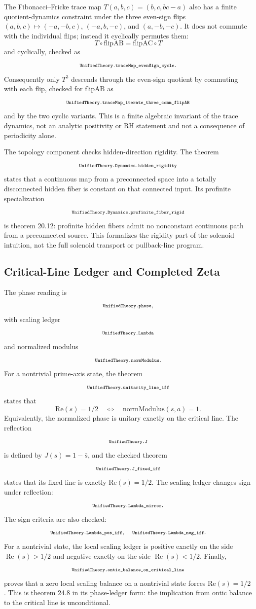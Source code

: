 \documentclass[11pt]{article}
\newcommand{\lean}[1]{\relax\ifmmode\hbox{\scriptsize\ttfamily\detokenize{#1}}\else{\small\texttt{\detokenize{#1}}}\fi}
\begin{document}
The Fibonacci--Fricke trace map $T(a,b,c)=(b,c,bc-a)$ also has a finite quotient-dynamics constraint under the three even-sign flips $(a,b,c)\mapsto(-a,-b,c)$, $(-a,b,-c)$, and $(a,-b,-c)$.  It does not commute with the individual flips; instead it cyclically permutes them:
$$
  T\circ\mathrm{flipAB}=\mathrm{flipAC}\circ T
$$
and cyclically, checked as
$$
  \lean{UnifiedTheory.traceMap_evenSign_cycle}.
$$
Consequently only $T^3$ descends through the even-sign quotient by commuting with each flip, checked for $\mathrm{flipAB}$ as
$$
  \lean{UnifiedTheory.traceMap_iterate_three_comm_flipAB}
$$
and by the two cyclic variants.  This is a finite algebraic invariant of the trace dynamics, not an analytic positivity or RH statement and not a consequence of periodicity alone.

The topology component checks hidden-direction rigidity.  The theorem
$$
  \lean{UnifiedTheory.Dynamics.hidden_rigidity}
$$
states that a continuous map from a preconnected space into a totally disconnected hidden fiber is constant on that connected input.  Its profinite specialization
$$
  \lean{UnifiedTheory.Dynamics.profinite_fiber_rigid}
$$
is theorem 20.12: profinite hidden fibers admit no nonconstant continuous path from a preconnected source.  This formalizes the rigidity part of the solenoid intuition, not the full solenoid transport or pullback-line program.

\subsection{Critical-Line Ledger and Completed Zeta}

The phase reading is
$$
  \lean{UnifiedTheory.phase},
$$
with scaling ledger
$$
  \lean{UnifiedTheory.Lambda}
$$
and normalized modulus
$$
  \lean{UnifiedTheory.normModulus}.
$$
For a nontrivial prime-axis state, the theorem
$$
  \lean{UnifiedTheory.unitarity_line_iff}
$$
states that
$$
  \mathrm{Re}(s)=1/2
  \quad\Longleftrightarrow\quad
  \mathrm{normModulus}(s,a)=1.
$$
Equivalently, the normalized phase is unitary exactly on the critical line.  The reflection
$$
  \lean{UnifiedTheory.J}
$$
is defined by $J(s)=1-\overline{s}$, and the checked theorem
$$
  \lean{UnifiedTheory.J_fixed_iff}
$$
states that its fixed line is exactly $\mathrm{Re}(s)=1/2$.  The scaling ledger changes sign under reflection:
$$
  \lean{UnifiedTheory.Lambda_mirror}.
$$
The sign criteria are also checked:
$$
  \lean{UnifiedTheory.Lambda_pos_iff},\quad
  \lean{UnifiedTheory.Lambda_neg_iff}.
$$
For a nontrivial state, the local scaling ledger is positive exactly on the side $\operatorname{Re}(s)>1/2$ and negative exactly on the side $\operatorname{Re}(s)<1/2$.
Finally,
$$
  \lean{UnifiedTheory.ontic_balance_on_critical_line}
$$
proves that a zero local scaling balance on a nontrivial state forces $\mathrm{Re}(s)=1/2$.  This is theorem 24.8 in its phase-ledger form: the implication from ontic balance to the critical line is unconditional.
\end{document}
